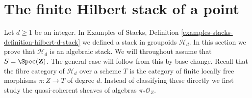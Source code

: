 









\section{The finite Hilbert stack of a point}
\label{section-hilbert-point}

\noindent
Let $d \geq 1$ be an integer. In
Examples of Stacks, Definition \ref{examples-stacks-definition-hilbert-d-stack}
we defined a stack in groupoids $\mathcal{H}_d$.
In this section we prove that $\mathcal{H}_d$ is an
algebraic stack. We will throughout assume that
$S = \Spec(\mathbf{Z})$.
The general case will follow from this by base change.
Recall that the fibre category of $\mathcal{H}_d$ over a scheme $T$
is the category of finite locally free morphisms $\pi : Z \to T$ of
degree $d$. Instead of classifying these directly we first
study the quasi-coherent sheaves of algebras $\pi_*\mathcal{O}_Z$.

